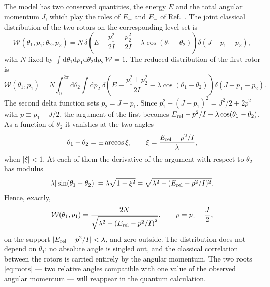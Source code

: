 \documentclass[aps,preprint,12pt,superscriptaddress,nofootinbib]{revtex4-2}
\newcommand{\dd}{\mathrm{d}}
\newcommand{\Erel}{E_{\rm rel}}
\newcommand{\Wc}{\mathcal{W}}
\begin{document}
The model has two conserved quantities, the energy $E$ and the total angular
momentum $J$, which play the roles of $E_{+}$ and $E_{-}$ of Ref.~\cite{DKS}. The
joint classical distribution of the two rotors on the corresponding level set is
\begin{equation}
\Wc(\theta_{1},p_{1};\theta_{2},p_{2})=N\,\delta\!\left(E-\frac{p_{1}^{2}}{2I}
-\frac{p_{2}^{2}}{2I}-\lambda\cos(\theta_{1}-\theta_{2})\right)
\delta\left(J-p_{1}-p_{2}\right),
\label{eq:Wjoint}
\end{equation}
with $N$ fixed by
$\int\dd\theta_{1}\dd p_{1}\dd\theta_{2}\dd p_{2}\,\Wc=1$. The reduced distribution of
the first rotor is
\begin{equation}
\Wc(\theta_{1},p_{1})=N\int_{0}^{2\pi}\dd\theta_{2}\int\dd p_{2}\;
\delta\!\left(E-\frac{p_{1}^{2}+p_{2}^{2}}{2I}-\lambda\cos(\theta_{1}-\theta_{2})\right)
\delta\left(J-p_{1}-p_{2}\right).
\label{eq:Wred}
\end{equation}
The second delta function sets $p_{2}=J-p_{1}$. Since
$p_{1}^{2}+(J-p_{1})^{2}=J^{2}/2+2p^{2}$ with $p\equiv p_{1}-J/2$, the argument of the
first becomes $\Erel-p^{2}/I-\lambda\cos(\theta_{1}-\theta_{2})$. As a function of
$\theta_{2}$ it vanishes at the two angles
\begin{equation}
\theta_{1}-\theta_{2}=\pm\arccos\xi,\qquad
\xi=\frac{\Erel-p^{2}/I}{\lambda},
\label{eq:roots}
\end{equation}
when $|\xi|<1$. At each of them the derivative of the argument with respect to
$\theta_{2}$ has modulus
\begin{equation}
\lambda|\sin(\theta_{1}-\theta_{2})|=\lambda\sqrt{1-\xi^{2}}
=\sqrt{\lambda^{2}-(\Erel-p^{2}/I)^{2}} .
\end{equation}
Hence, exactly,
\begin{equation}
\Wc(\theta_{1},p_{1})=\frac{2N}{\sqrt{\lambda^{2}-\left(\Erel-p^{2}/I\right)^{2}}},
\qquad p=p_{1}-\frac{J}{2},
\label{eq:Wexact}
\end{equation}
on the support $|\Erel-p^{2}/I|<\lambda$, and zero outside. The distribution does not
depend on $\theta_{1}$: no absolute angle is singled out, and the classical
correlation between the rotors is carried entirely by the angular momentum. The two
roots \eqref{eq:roots} --- two relative angles compatible with one value of the
observed angular momentum --- will reappear in the quantum calculation.
\end{document}
